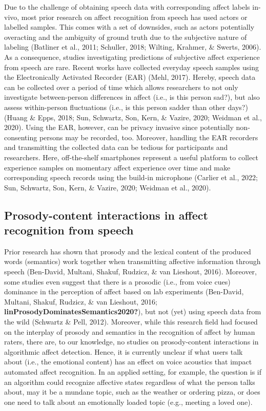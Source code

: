 \documentclass[
  english,
  man,floatsintext]{apa6}
\begin{document}
Due to the challenge of obtaining speech data with corresponding affect labels in-vivo, most prior research on affect recognition from speech has used actors or labelled samples. This comes with a set of downsides, such as actors potentially overacting and the ambiguity of ground truth due to the subjective nature of labeling (Batliner et al., 2011; Schuller, 2018; Wilting, Krahmer, \& Swerts, 2006). As a consequence, studies investigating predictions of subjective affect experience from speech are rare. Recent works have collected everyday speech samples using the Electronically Activated Recorder (EAR) (Mehl, 2017). Hereby, speech data can be collected over a period of time which allows researchers to not only investigate between-person differences in affect (i.e., is this person sad?), but also assess within-person fluctuations (i.e., is this person sadder than other days?) (Huang \& Epps, 2018; Sun, Schwartz, Son, Kern, \& Vazire, 2020; Weidman et al., 2020). Using the EAR, however, can be privacy invasive since potentially non-consenting persons may be recorded, too. Moreover, handling the EAR recorders and transmitting the collected data can be tedious for participants and researchers.
Here, off-the-shelf smartphones represent a useful platform to collect experience samples on momentary affect experience over time and make corresponding speech records using the build-in microphone (Carlier et al., 2022; Sun, Schwartz, Son, Kern, \& Vazire, 2020; Weidman et al., 2020).

\hypertarget{prosody-content-interactions-in-affect-recognition-from-speech}{%
\subsection{Prosody-content interactions in affect recognition from speech}\label{prosody-content-interactions-in-affect-recognition-from-speech}}

Prior research has shown that prosody and the lexical content of the produced words (semantics) work together when transmitting affective information through speech (Ben-David, Multani, Shakuf, Rudzicz, \& van Lieshout, 2016). Moreover, some studies even suggest that there is a prosodic (i.e., from voice cues) dominance in the perception of affect based on lab experiments (Ben-David, Multani, Shakuf, Rudzicz, \& van Lieshout, 2016; \textbf{linProsodyDominatesSemantics2020?}), but not (yet) using speech data from the wild (Schwartz \& Pell, 2012). Moreover, while this research field had focused on the interplay of prosody and semantics in the recognition of affect by human raters, there are, to our knowledge, no studies on prosody-content interactions in algorithmic affect detection. Hence, it is currently unclear if what users talk about (i.e., the emotional content) has an effect on voice acoustics that impact automated affect recognition. In an applied setting, for example, the question is if an algorithm could recognize affective states regardless of what the person talks about, may it be a mundane topic, such as the weather or ordering pizza, or does one need to talk about an emotionally loaded topic (e.g., meeting a loved one).
\end{document}

